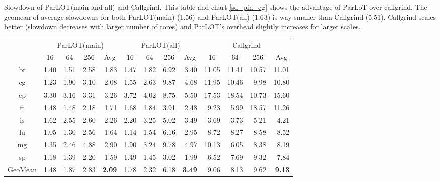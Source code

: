 \label{t_sd.pin.cg}
\caption{Slowdown of ParLOT(main and all) and Callgrind. This table and chart \ref{sd_pin_cg} shows the advantage of ParLoT over callgrind. The geomean of average slowdowns for both ParLOT(main) (1.56) and ParLOT(all) (1.63) is way smaller than Callgrind (5.51). Callgrind scales better (slowdown decreases with larger number of cores) and ParLOT's overhead slightly increases for larger scales.}
\begin{tabular}{c|rrrr|rrrr|rrrr|}
\cline{2-13}
\multicolumn{1}{l|}{} & \multicolumn{4}{c|}{ParLOT(main)} & \multicolumn{4}{c|}{ParLOT(all)} & \multicolumn{4}{c|}{Callgrind} \\ \cline{2-13} 
\multicolumn{1}{l|}{} & \multicolumn{1}{c}{16} & \multicolumn{1}{c}{64} & \multicolumn{1}{c}{256} & \multicolumn{1}{c|}{Avg} & \multicolumn{1}{c}{16} & \multicolumn{1}{c}{64} & \multicolumn{1}{c}{256} & \multicolumn{1}{c|}{Avg} & \multicolumn{1}{c}{16} & \multicolumn{1}{c}{64} & \multicolumn{1}{c}{256} & \multicolumn{1}{c|}{Avg} \\ \hline
\multicolumn{1}{|c|}{bt} & 1.40 & 1.51 & 2.58 & 1.83 & 1.47 & 1.82 & 6.92 & 3.40 & 11.05 & 11.41 & 10.57 & 11.01 \\
\multicolumn{1}{|c|}{cg} & 1.23 & 1.90 & 3.10 & 2.08 & 1.55 & 2.63 & 9.87 & 4.68 & 11.95 & 10.46 & 9.98 & 10.80 \\
\multicolumn{1}{|c|}{ep} & 3.30 & 3.16 & 3.31 & 3.26 & 3.72 & 4.02 & 8.75 & 5.50 & 17.53 & 18.54 & 10.73 & 15.60 \\
\multicolumn{1}{|c|}{ft} & 1.48 & 1.48 & 2.18 & 1.71 & 1.68 & 1.84 & 3.91 & 2.48 & 9.23 & 5.99 & 18.57 & 11.26 \\
\multicolumn{1}{|c|}{is} & 1.62 & 2.55 & 2.60 & 2.26 & 2.20 & 3.25 & 5.02 & 3.49 & 3.69 & 3.73 & 5.21 & 4.21 \\
\multicolumn{1}{|c|}{lu} & 1.05 & 1.30 & 2.56 & 1.64 & 1.14 & 1.54 & 6.16 & 2.95 & 8.72 & 8.27 & 8.58 & 8.52 \\
\multicolumn{1}{|c|}{mg} & 1.35 & 2.46 & 4.88 & 2.90 & 1.90 & 3.24 & 9.78 & 4.97 & 10.13 & 6.05 & 8.38 & 8.19 \\
\multicolumn{1}{|c|}{sp} & 1.18 & 1.39 & 2.20 & 1.59 & 1.49 & 1.45 & 3.02 & 1.99 & 6.52 & 7.69 & 9.32 & 7.84 \\ \hline
\multicolumn{1}{|c|}{GeoMean} & 1.48 & 1.87 & 2.83 & \textbf{2.09} & 1.78 & 2.32 & 6.18 & \textbf{3.49} & 9.06 & 8.13 & 9.62 & \textbf{9.13} \\ \hline
\end{tabular}
